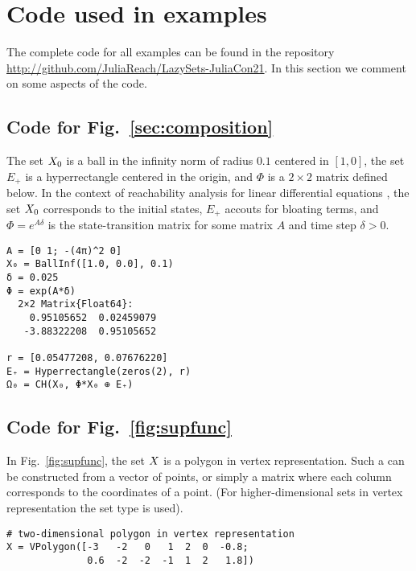 \section{Code used in examples} \label{sec:code_examples}

The complete code for all examples can be found in the repository \url{http://github.com/JuliaReach/LazySets-JuliaCon21}. In this section we comment on some aspects of the code.


\subsection{Code for Fig.~\ref{sec:composition}} \label{sec:omega0}

The set $X_0$ is a ball in the infinity norm of radius $0.1$ centered in $[1, 0]$, the set $E_+$ is a hyperrectangle centered in the origin, and $\Phi$ is a $2 \times 2$ matrix defined below.
%
In the context of reachability analysis for linear differential equations \cite{BogomolovFFVPS18}, the set $X_0$ corresponds to the initial states, $E_+$ accouts for bloating terms, and $\Phi = e^{A\delta}$ is the state-transition matrix for some matrix $A$ and time step $\delta > 0$.

\begin{minipage}{\linewidth}
\vspace{-\abovedisplayskip}
\begin{lstlisting}
A = [0 1; -(4π)^2 0]
X₀ = BallInf([1.0, 0.0], 0.1)
δ = 0.025
Φ = exp(A*δ)
  2×2 Matrix{Float64}:
    0.95105652  0.02459079
   -3.88322208  0.95105652

r = [0.05477208, 0.07676220]
E₊ = Hyperrectangle(zeros(2), r)
Ω₀ = CH(X₀, Φ*X₀ ⊕ E₊)
\end{lstlisting}
\end{minipage}

\subsection{Code for Fig.~\ref{fig:supfunc}}

In Fig.~\ref{fig:supfunc}, the set $X$ is a polygon in vertex representation. Such a  can be constructed from a vector of points, or simply a matrix where each column corresponds to the coordinates of a point. (For higher-dimensional sets in vertex representation the set type  is used).

\begin{minipage}{\linewidth}
\vspace{-\abovedisplayskip}
\begin{lstlisting}
# two-dimensional polygon in vertex representation
X = VPolygon([-3   -2   0   1  2  0  -0.8;
              0.6  -2  -2  -1  1  2   1.8])
\end{lstlisting}
\end{minipage}


